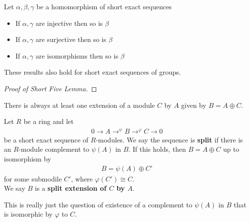 \documentclass{memoir}
\begin{document}
\begin{prop}
	Let \(\alpha ,\beta ,\gamma \) be a homomorphism of short exact sequences
\begin{center}
\end{center}
\begin{itemize}
	\item If \(\alpha ,\gamma \) are injective then so is \(\beta \) 
	\item If \(\alpha ,\gamma \) are surjective then so is \(\beta \) 
	\item If \(\alpha ,\gamma \) are isomorphisms then so is \(\beta \)
\end{itemize}
\end{prop}
These results also hold for short exact sequences of groups.

\begin{proof}[Proof of Short Five Lemma]
	
\end{proof}
There is always at least one extension of a module \(C\) by \(A\) given by \(B = A \oplus C\).

\begin{defn}
	Let \(R\) be a ring and let
	\begin{align*}
		0 \to A \to^{\psi }B \to^{\varphi }C \to 0
	\end{align*}
	be a short exact sequence of \(R\)-modules. We say the sequence is \textbf{split} if there is an \(R\)-module complement to \(\psi (A)\) in \(B\). If this holds, then \(B = A \oplus C\) up to isomorphism by
	\begin{align*}
		B = \psi (A) \oplus C'
	\end{align*}
	for some submodile \(C'\), where \(\varphi (C') \cong C\).\\

	We say \(B\) is a \textbf{split extension of \(C\) by \(A\)}.
\end{defn}
This is really just the question of existence of a complement to \(\psi (A)\) in \(B\) that is isomorphic by \(\varphi \) to \(C\).
\end{document}
